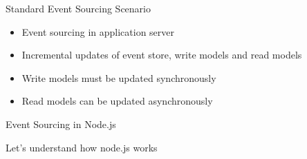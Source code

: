 \begin{frame}[fragile]{Standard Event Sourcing Scenario}

\begin{itemize}
\item Event sourcing in application server
\item Incremental updates of event store, write models and read models
\item Write models must be updated synchronously
\item Read models can be updated asynchronously
\end{itemize}

\end{frame}

\begin{frame}[fragile]{Event Sourcing in Node.js}

Let's understand how node.js works

\end{frame}

